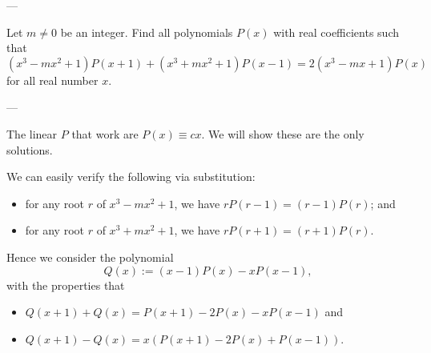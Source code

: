 
---

Let $m\ne0$ be an integer. Find all polynomials $P(x)$ with real coefficients such that
\[(x^3-mx^2+1)P(x+1)+(x^3+mx^2+1)P(x-1)=2(x^3-mx+1)P(x)\]
for all real number $x$.

---

The linear $P$ that work are $P(x)\equiv cx$. We will show these are the only solutions.

We can easily verify the following via substitution:
\begin{itemize}[itemsep=0em]
    \item for any root $r$ of $x^3-mx^2+1$, we have $rP(r-1)=(r-1)P(r)$; and
    \item for any root $r$ of $x^3+mx^2+1$, we have $rP(r+1)=(r+1)P(r)$.
\end{itemize}
Hence we consider the polynomial
\[Q(x):=(x-1)P(x)-xP(x-1),\]
with the properties that
\begin{itemize}[itemsep=0em]
    \item $Q(x+1)+Q(x)=P(x+1)-2P(x)-xP(x-1)$ and
    \item $Q(x+1)-Q(x)=x(P(x+1)-2P(x)+P(x-1))$.
\end{itemize}

